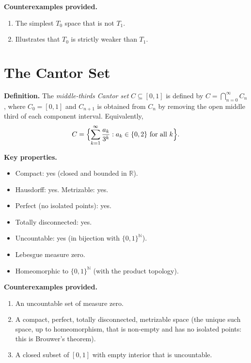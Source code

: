 \documentclass[11pt,a4paper,twoside]{book}
\theoremstyle{remark}
\theoremstyle{definition}
\theoremstyle{definition}
\begin{document}
\textbf{Counterexamples provided.}
\begin{enumerate}
  \item The simplest $T_0$ space that is not $T_1$.
  \item Illustrates that $T_0$ is strictly weaker than $T_1$.
\end{enumerate}

\section{The Cantor Set}
\label{app:cantor}

\textbf{Definition.}
The \emph{middle-thirds Cantor set} $C\subseteq[0,1]$ is defined by
$C = \bigcap_{n=0}^{\infty} C_n$, where $C_0=[0,1]$ and $C_{n+1}$ is
obtained from $C_n$ by removing the open middle third of each component
interval.  Equivalently,
\[
  C = \Bigl\{\sum_{k=1}^{\infty}\frac{a_k}{3^k} : a_k\in\{0,2\}
      \text{ for all }k\Bigr\}.
\]

\medskip
\textbf{Key properties.}
\begin{itemize}
  \item Compact: yes (closed and bounded in $\mathbb{R}$).
  \item Hausdorff: yes. \quad Metrizable: yes.
  \item Perfect (no isolated points): yes.
  \item Totally disconnected: yes.
  \item Uncountable: yes (in bijection with $\{0,1\}^{\mathbb{N}}$).
  \item Lebesgue measure zero.
  \item Homeomorphic to $\{0,1\}^{\mathbb{N}}$ (with the product topology).
\end{itemize}

\textbf{Counterexamples provided.}
\begin{enumerate}
  \item An uncountable set of measure zero.
  \item A compact, perfect, totally disconnected, metrizable space
        (the unique such space, up to homeomorphism, that is non-empty
        and has no isolated points: this is Brouwer's theorem).
  \item A closed subset of $[0,1]$ with empty interior that is
        uncountable.
\end{enumerate}
\end{document}
